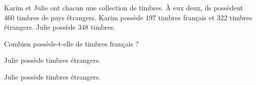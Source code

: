 Karim et Julie ont chacun une collection de timbres. \`A eux deux, ils
possèdent 460 timbres de pays étrangers. Karim possède 197 timbres
français et 322 timbres étrangers. Julie possède 348 timbres.
\par Combien possède-t-elle de timbres français ?
\begin{multicols}{2}
\par Julie possède  timbres étrangers.
\par
{}
\par Julie possède  timbres étrangers.
\end{multicols}
